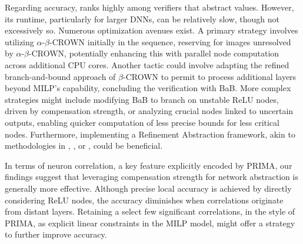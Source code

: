 Regarding accuracy, {\toolname} ranks highly among verifiers that abstract values. However, its runtime, particularly for larger DNNs, can be relatively slow, though not excessively so. Numerous optimization avenues exist. A primary strategy involves utilizing $\alpha$-$\beta$-CROWN initially in the sequence, reserving {\toolname} for images unresolved by $\alpha$-$\beta$-CROWN, potentially enhancing this with parallel node computation across additional CPU cores. Another tactic could involve adapting the refined branch-and-bound approach of $\beta$-CROWN to permit {\toolname} to process additional layers beyond MILP's capability, concluding the verification with BaB. More complex strategies might include modifying BaB to branch on unstable ReLU nodes, driven by compensation strength, or analyzing crucial nodes linked to uncertain outputs, enabling quicker computation of less precise bounds for less critical nodes. Furthermore, implementing a Refinement Abstraction framework, akin to methodologies in \cite{atva}, \cite{elboher}, or \cite{SRGR}, could be beneficial.


In terms of neuron correlation, a key feature explicitly encoded by PRIMA, our findings suggest that leveraging compensation strength for network abstraction is generally more effective. Although precise local accuracy is achieved by directly considering ReLU nodes, the accuracy diminishes when correlations originate from distant layers. Retaining a select few significant correlations, in the style of PRIMA, as explicit linear constraints in the MILP model, might offer a strategy to further improve accuracy. 



